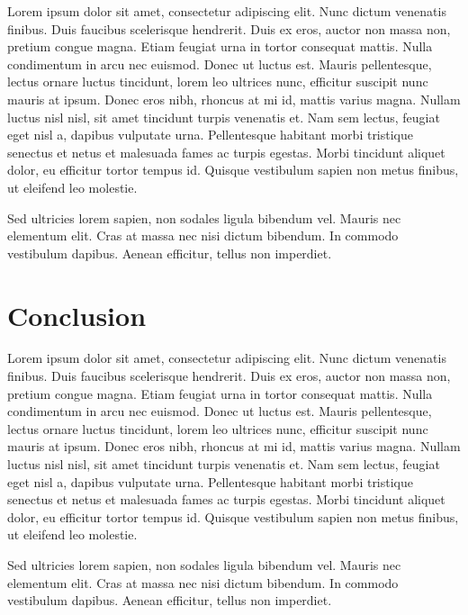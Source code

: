 \documentclass{article}
\begin{document}
		Lorem ipsum dolor sit amet, consectetur adipiscing elit. Nunc dictum venenatis finibus. Duis faucibus scelerisque hendrerit. Duis ex eros, auctor non massa non, pretium congue magna. Etiam feugiat urna in tortor consequat mattis. Nulla condimentum in arcu nec euismod. Donec ut luctus est. Mauris pellentesque, lectus ornare luctus tincidunt, lorem leo ultrices nunc, efficitur suscipit nunc mauris at ipsum. Donec eros nibh, rhoncus at mi id, mattis varius magna. Nullam luctus nisl nisl, sit amet tincidunt turpis venenatis et. Nam sem lectus, feugiat eget nisl a, dapibus vulputate urna. Pellentesque habitant morbi tristique senectus et netus et malesuada fames ac turpis egestas. Morbi tincidunt aliquet dolor, eu efficitur tortor tempus id. Quisque vestibulum sapien non metus finibus, ut eleifend leo molestie.

		Sed ultricies lorem sapien, non sodales ligula bibendum vel. Mauris nec elementum elit. Cras at massa nec nisi dictum bibendum. In commodo vestibulum dapibus. Aenean efficitur, tellus non imperdiet. 

\section{Conclusion}
  \label{sec:Conlusion}
  Lorem ipsum dolor sit amet, consectetur adipiscing elit. Nunc dictum venenatis finibus. Duis faucibus scelerisque hendrerit. Duis ex eros, auctor non massa non, pretium congue magna. Etiam feugiat urna in tortor consequat mattis. Nulla condimentum in arcu nec euismod. Donec ut luctus est. Mauris pellentesque, lectus ornare luctus tincidunt, lorem leo ultrices nunc, efficitur suscipit nunc mauris at ipsum. Donec eros nibh, rhoncus at mi id, mattis varius magna. Nullam luctus nisl nisl, sit amet tincidunt turpis venenatis et. Nam sem lectus, feugiat eget nisl a, dapibus vulputate urna. Pellentesque habitant morbi tristique senectus et netus et malesuada fames ac turpis egestas. Morbi tincidunt aliquet dolor, eu efficitur tortor tempus id. Quisque vestibulum sapien non metus finibus, ut eleifend leo molestie.

  Sed ultricies lorem sapien, non sodales ligula bibendum vel. Mauris nec elementum elit. Cras at massa nec nisi dictum bibendum. In commodo vestibulum dapibus. Aenean efficitur, tellus non imperdiet. 
\end{document}

